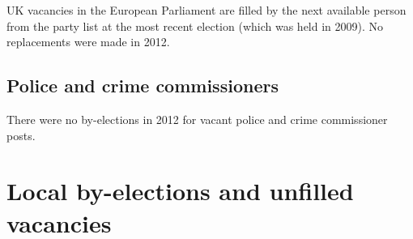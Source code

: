 \documentclass[a4paper,openany]{book}
\begin{document}
UK vacancies in the European Parliament are filled by the next available person from the party list at the most recent election (which was held in 2009). 
No replacements were made in 2012.

\section{Police and crime commissioners}

There were no by-elections in 2012 for vacant police and crime commissioner posts.

\chapter{Local by-elections and unfilled vacancies}
\end{document}
